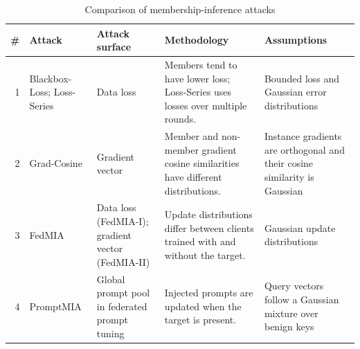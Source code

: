 \begin{table}[htbp]
\centering
\begin{tabular}{rp{.15\linewidth}p{.18\linewidth}p{.28\linewidth}p{.24\linewidth}}
\toprule
\# & Attack & Attack surface & Methodology & Assumptions \\
\midrule
1 & Blackbox-Loss; Loss-Series & Data loss & Members tend to have lower loss; Loss-Series uses losses over multiple rounds. & Bounded loss and Gaussian error distributions \\
2 & Grad-Cosine & Gradient vector & Member and non-member gradient cosine similarities have different distributions. & Instance gradients are orthogonal and their cosine similarity is Gaussian \\
3 & FedMIA & Data loss (FedMIA-I); gradient vector (FedMIA-II) & Update distributions differ between clients trained with and without the target. & Gaussian update distributions \\
4 & PromptMIA & Global prompt pool in federated prompt tuning & Injected prompts are updated when the target is present. & Query vectors follow a Gaussian mixture over benign keys \\
\bottomrule
\end{tabular}
\caption{Comparison of membership-inference attacks}
\label{tab:table3}
\end{table}
